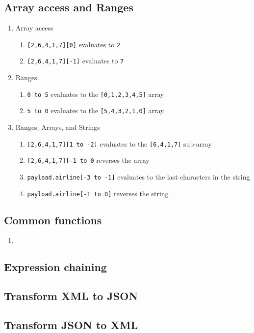 \subsection{Array access and Ranges}
\begin{enumerate}[resume*]
\item Array access
  \begin{enumerate}
  \item \texttt{[2,6,4,1,7][0]} evaluates to \texttt{2}
  \item \texttt{[2,6,4,1,7][-1]} evaluates to \texttt{7}
  \end{enumerate}
\item Ranges
  \begin{enumerate}
  \item \texttt{0 to 5} evaluates to the \texttt{[0,1,2,3,4,5]} array 
  \item \texttt{5 to 0} evaluates to the \texttt{[5,4,3,2,1,0]} array
  \end{enumerate}
\item Ranges, Arrays, and Strings
  \begin{enumerate}
  \item \texttt{[2,6,4,1,7][1 to -2]} evaluates to the \texttt{[6,4,1,7]} sub-array
  \item \texttt{[2,6,4,1,7][-1 to 0} reverses the array
  \item \texttt{payload.airline[-3 to -1]} evaluates to the last characters in the string
  \item \texttt{payload.airline[-1 to 0]} reverses the string
  \end{enumerate}
\end{enumerate}

\subsection{Common functions}
\begin{enumerate}[resume*]
\item 
\end{enumerate}

\subsection{Expression chaining}

\subsection{Transform XML to JSON}

\subsection{Transform JSON to XML}

